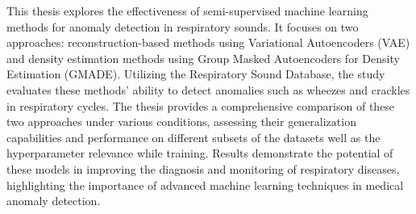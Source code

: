 
\cleardoubleoddpage%
\begin{abstract*}
    This thesis explores the effectiveness of semi-supervised machine learning methods for anomaly detection in respiratory sounds. It focuses on two approaches: reconstruction-based methods using Variational Autoencoders (VAE) and density estimation methods using Group Masked Autoencoders for Density Estimation (GMADE). Utilizing the Respiratory Sound Database, the study evaluates these methods' ability to detect anomalies such as wheezes and crackles in respiratory cycles. The thesis provides a comprehensive comparison of these two approaches under various conditions, assessing their generalization capabilities and performance on different subsets of the datasets well as the hyperparameter relevance while training. Results demonstrate the potential of these models in improving the diagnosis and monitoring of respiratory diseases, highlighting the importance of advanced machine learning techniques in medical anomaly detection.
\end{abstract*}





